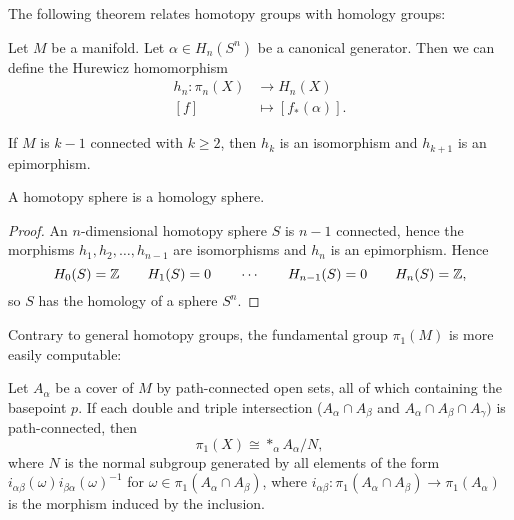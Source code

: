 The following theorem relates homotopy groups with homology groups:
\begin{theorem}
    Let $M$ be a manifold.
    Let $\alpha \in H_n(S^{n})$ be a canonical generator.
    Then we can define the Hurewicz homomorphism
    \begin{align*}
        h_n: \pi_n(X) &\longrightarrow H_n(X) \\
        [f] &\longmapsto [f_*(\alpha)]
    .\end{align*}

    If $M$ is  $k-1$ connected with  $k\ge 2$, then $h_k$ is an isomorphism and $h_{k+1}$ is an epimorphism.
\end{theorem}

\begin{prop}
    A homotopy sphere is a homology sphere.
\end{prop}
\begin{proof}
    An $n$-dimensional homotopy sphere $S$ is $n-1$ connected, hence the morphisms $h_1, h_2, \ldots, h_{n-1}$ are isomorphisms and $h_n$ is an epimorphism.
    Hence
    \[
        H_0(S) = \mathbb{Z} \qquad
        H_1(S) = 0 \qquad 
        \cdots \qquad
        H_{n-1}(S) = 0 \qquad 
        H_{n}(S) = \mathbb{Z}
    ,\] 
    so $S$ has the homology of a sphere  $S^{n}$.
\end{proof}

Contrary to general homotopy groups, the fundamental group $\pi_1(M)$ is more easily computable:
\begin{theorem}
    Let $A_\alpha$ be a cover of $M$ by path-connected open sets, all of which containing the basepoint $p$.
    If each double and triple intersection ($A_\alpha \cap A_\beta$ and $A_\alpha \cap A_\beta \cap A_\gamma)$ is path-connected, then
    \[
        \pi_1(X) \cong *_{\alpha} A_\alpha / N
    ,\] 
    where $N$ is the normal subgroup generated by all elements of the form  $i_{\alpha \beta}(\omega) i_{\beta \alpha}(\omega)^{-1}$ for $\omega \in \pi_1(A_\alpha \cap A_\beta)$, where $i_{\alpha\beta}: \pi_1(A_\alpha \cap A_\beta) \to  \pi_1(A_\alpha)$ is the morphism induced by the inclusion.
\end{theorem}
